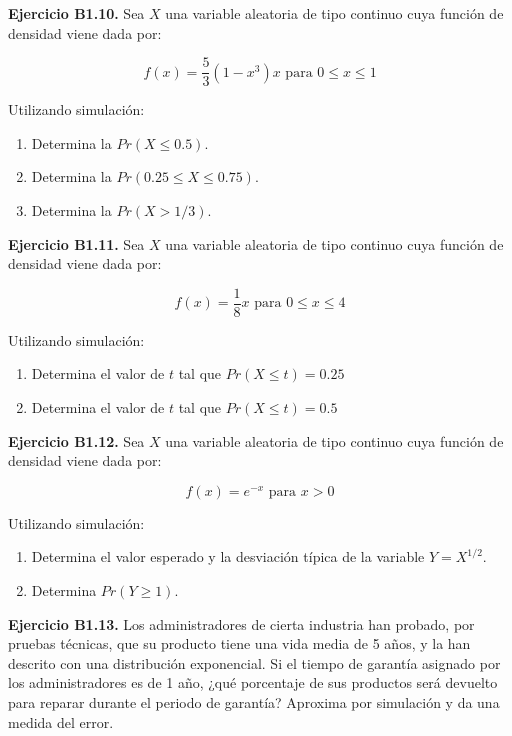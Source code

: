 \documentclass[
]{book}
\providecommand{\tightlist}{%
  \setlength{\itemsep}{0pt}\setlength{\parskip}{0pt}}
\theoremstyle{definition}
\theoremstyle{definition}
\theoremstyle{definition}
\theoremstyle{definition}
\theoremstyle{remark}
\begin{document}
\textbf{Ejercicio B1.10.} Sea \(X\) una variable aleatoria de tipo continuo cuya función de densidad viene dada por:

\begin{equation*}
f(x) = \frac{5}{3}(1-x^3)x  \text{ para } 0 \leq x \leq 1
\end{equation*}

Utilizando simulación:

\begin{enumerate}
\def\labelenumi{\arabic{enumi}.}
\tightlist
\item
  Determina la \(Pr(X \leq 0.5).\)
\item
  Determina la \(Pr(0.25 \leq X \leq 0.75).\)
\item
  Determina la \(Pr(X > 1/3).\)
\end{enumerate}

\textbf{Ejercicio B1.11.} Sea \(X\) una variable aleatoria de tipo continuo cuya función de densidad viene dada por:

\begin{equation*}
f(x) = \frac{1}{8}x \text{ para } 0 \leq x \leq 4
\end{equation*}

Utilizando simulación:

\begin{enumerate}
\def\labelenumi{\arabic{enumi}.}
\tightlist
\item
  Determina el valor de \(t\) tal que \(Pr(X \leq t) = 0.25\)
\item
  Determina el valor de \(t\) tal que \(Pr(X \leq t) = 0.5\)
\end{enumerate}

\textbf{Ejercicio B1.12.} Sea \(X\) una variable aleatoria de tipo continuo cuya función de densidad viene dada por:

\begin{equation*}
f(x) = e^{-x} \text{ para } x > 0
\end{equation*}

Utilizando simulación:

\begin{enumerate}
\def\labelenumi{\arabic{enumi}.}
\tightlist
\item
  Determina el valor esperado y la desviación típica de la variable \(Y = X^{1/2}.\)
\item
  Determina \(Pr(Y \geq 1).\)
\end{enumerate}

\textbf{Ejercicio B1.13.} Los administradores de cierta industria han probado, por pruebas técnicas, que su producto tiene una vida media de 5 años, y la han descrito con una distribución exponencial. Si el tiempo de garantía asignado por los administradores es de 1 año, ¿qué porcentaje de sus productos será devuelto para reparar durante el periodo de garantía? Aproxima por simulación y da una medida del error.
\end{document}
